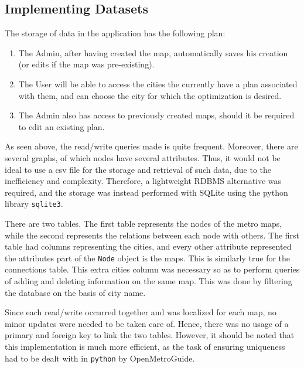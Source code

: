 \documentclass[fontsize=11pt]{article}
\begin{document}
    \subsection*{Implementing Datasets}
	The storage of data in the application has the following plan:
	
	\begin{enumerate}
		\item The Admin, after having created the map, automatically saves his creation (or edits if the map was pre-existing).
		
		\item The User will be able to access the cities the currently have a plan associated with them, and can choose the city for which the optimization is desired.
		
		\item The Admin also has access to previously created maps, should it be required to edit an existing plan.
	\end{enumerate}

	As seen above, the read/write queries made is quite frequent. Moreover, there are several graphs, of which nodes have several attributes. Thus, it would not be ideal to use a csv file for the storage and retrieval of such data, due to the inefficiency and complexity. Therefore, a lightweight RDBMS alternative was required, and the storage was instead performed with SQLite using the python library \texttt{sqlite3}.
	
	 There are two tables. The first table represents the nodes of the metro maps, while the second represents the relations between each node with others. The first table had columns representing the cities, and every other attribute represented the attributes part of the \texttt{Node} object is the maps. This is similarly true for the connections table. This extra cities column was necessary so as to perform queries of adding and deleting information on the same map. This was done by filtering the database on the basis of city name.
	 
	 Since each read/write occurred together and was localized for each map,  no minor updates were needed to be taken care of. Hence, there was no usage of a primary and foreign key to link the two tables. However, it should be noted that this implementation is much more efficient, as the task of ensuring uniqueness had to be dealt with in \texttt{python} by OpenMetroGuide. 
\end{document}
